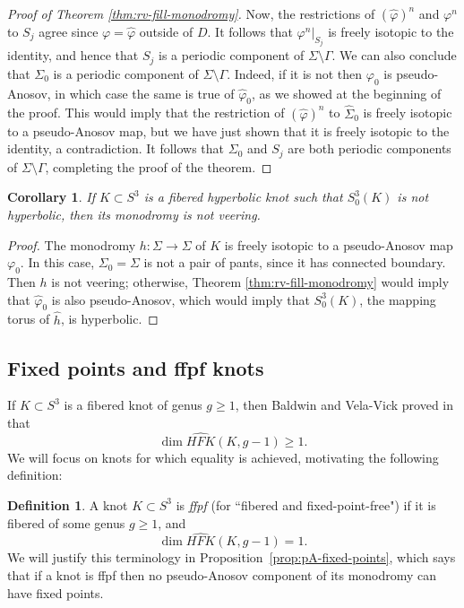 \documentclass[11pt]{amsart}
\newtheorem {corollary}[theorem]{Corollary}
\numberwithin{equation}{section}
\numberwithin{theorem}{section}
\theoremstyle{definition}
\newtheorem{definition}[theorem]{Definition}
\newcommand\hfk{\mathit{HFK}}
\newcommand\hfkhat{\widehat{\hfk}}
\begin{document}
\begin{proof}[Proof of Theorem \ref{thm:rv-fill-monodromy}]
Now, the restrictions of $(\hat\varphi)^n$ and $\varphi^n$ to $S_j$ agree since  $\varphi = \hat\varphi$ outside of $D$. It follows that $\varphi^n|_{S_j}$ is freely isotopic to the identity, and hence that $S_j$ is a periodic component of $\Sigma\setminus \Gamma$.  We can also conclude that $\Sigma_0$ is a periodic component of $\Sigma\setminus \Gamma$. Indeed, if it is not then $\varphi_0$ is   pseudo-Anosov, in which case the same is true of $\hat\varphi_0$, as we showed at the beginning of the proof. This would imply that the restriction of $(\hat\varphi)^n$ to $\hat\Sigma_0$ is freely isotopic to a pseudo-Anosov map, but we have just shown that it is freely isotopic to the identity, a contradiction.
It follows that $\Sigma_0$ and $S_j$ are both periodic components of $\Sigma\setminus \Gamma$, completing the proof of the theorem.
\end{proof}

\begin{corollary} \label{cor:not-veering}
If  $K \subset S^3$ is a fibered hyperbolic knot such that  $S^3_0(K)$ is not hyperbolic, then its monodromy is not veering.
\end{corollary}

\begin{proof}
The monodromy $h:\Sigma\to \Sigma$ of $K$ is freely isotopic to a pseudo-Anosov map $\varphi_0$. In this case, $\Sigma_0 = \Sigma$ is not a pair of pants, since it has connected boundary.  Then $h$ is not veering; otherwise, Theorem \ref{thm:rv-fill-monodromy} would imply that $\hat\varphi_0$ is also pseudo-Anosov, which would imply that $S^3_0(K)$, the mapping torus of $\hat h$, is hyperbolic.
\end{proof}

\subsection{Fixed points and ffpf knots} 

If $K \subset S^3$ is a fibered knot of genus $g \geq 1$, then Baldwin and Vela-Vick proved in \cite{baldwin-velavick}  that
\[ \dim \hfkhat(K, g-1) \geq 1. \]
We will focus on knots for which  equality is achieved, motivating the following definition:

\begin{definition} \label{def:ffpf}
A knot $K \subset S^3$ is \emph{ffpf} (for ``fibered and fixed-point-free") if it is fibered of some genus $g \geq 1$, and 
\[ \dim \hfkhat(K,g-1) = 1. \] We will justify this terminology in Proposition~\ref{prop:pA-fixed-points}, which says that if a knot is ffpf then no pseudo-Anosov component of its monodromy can have fixed points. 
\end{definition}
\end{document}
